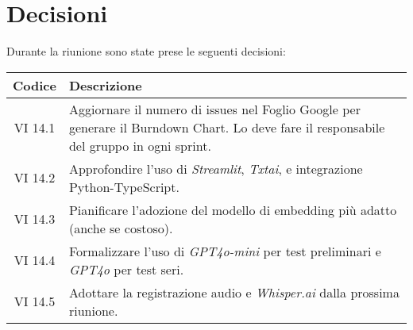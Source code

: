 
\section{Decisioni}

Durante la riunione sono state prese le seguenti decisioni:

\vspace{0.5cm}

\begin{table}[htbp]
    \centering
    \begin{tabular}{|c|p{}|}
        \hline
        \rowcolor[gray]{0.75}
        \textbf{Codice} & \textbf{Descrizione} \\
        \hline
        VI 14.1 & Aggiornare il numero di issues nel Foglio Google per generare il Burndown Chart. Lo deve fare il 
        responsabile del gruppo in ogni sprint. \\
        \hline
        VI 14.2 & Approfondire l'uso di \emph{Streamlit}, \emph{Txtai}, e integrazione Python-TypeScript. \\
        \hline
        VI 14.3 & Pianificare l'adozione del modello di embedding più adatto (anche se costoso). \\
        \hline
        VI 14.4 & Formalizzare l'uso di \emph{GPT4o-mini} per test preliminari e \emph{GPT4o} per test seri. \\
        \hline
        VI 14.5 & Adottare la registrazione audio e \emph{Whisper.ai} dalla prossima riunione. \\
        \hline
    \end{tabular}
\end{table}
